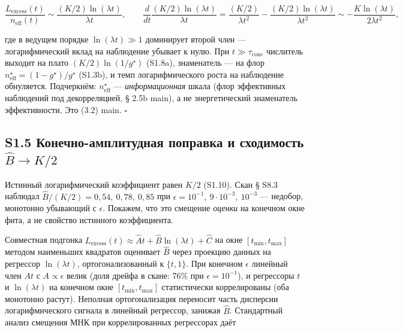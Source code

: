 \documentclass[12pt]{iopart}
\providecommand{\texorpdfstring}[2]{#1}
\begin{document}
\[\frac{L_{\text{excess}}(t)}{n_{\text{eff}}(t)} \sim \frac{(K/2)\ln(\lambda t)}{\lambda t}, \qquad \frac{d}{dt}\frac{(K/2)\ln(\lambda t)}{\lambda t} = \frac{(K/2)}{\lambda t^2} - \frac{(K/2)\ln(\lambda t)}{\lambda t^2} \sim -\frac{K\ln(\lambda t)}{2\lambda t^2},\]



где в ведущем порядке \(\ln(\lambda t) \gg 1\) доминирует второй член --- логарифмический вклад на наблюдение убывает к нулю. При \(t\gg\tau_{\text{conc}}\) числитель выходит на плато \((K/2)\ln(1/g^\star)\) (S1.8a), знаменатель --- на флор \(n_{\text{eff}}^\star = (1-g^\star)/g^\star\) (S1.3b), и темп логарифмического роста на наблюдение обнуляется. Подчеркнём: \(n_{\text{eff}}^\star\) --- \emph{информационная} шкала (флор эффективных наблюдений под декорреляцией, § 2.5b main), а не энергетический знаменатель эффективности. Это (3.2) main. \(\square\)



\subsection{\texorpdfstring{S1.5 Конечно-амплитудная поправка и сходимость \(\hat B \to K/2\)}{S1.5 Конечно-амплитудная поправка и сходимость \textbackslash hat B \textbackslash to K/2}}\label{s1.5-ux43aux43eux43dux435ux447ux43dux43e-ux430ux43cux43fux43bux438ux442ux443ux434ux43dux430ux44f-ux43fux43eux43fux440ux430ux432ux43aux430-ux438-ux441ux445ux43eux434ux438ux43cux43eux441ux442ux44c-hat-b-to-k2}



Истинный логарифмический коэффициент равен \(K/2\) (S1.10). Скан § S8.3 \cite{Andriishin2026b} наблюдал \(\hat B/(K/2) = 0{,}54,\ 0{,}78,\ 0{,}85\) при \(\epsilon = 10^{-1},\ 9\cdot10^{-3},\ 10^{-3}\) --- недобор, монотонно убывающий с \(\epsilon\). Покажем, что это смещение \emph{оценки} на конечном окне фита, а не свойство истинного коэффициента.



Совместная подгонка \(L_{\text{excess}}(t) \approx \hat A t + \hat B\ln(\lambda t) + \hat C\) на окне \([t_{\min}, t_{\max}]\) методом наименьших квадратов оценивает \(\hat B\) через проекцию данных на регрессор \(\ln(\lambda t)\), ортогонализованный к \(\{t, 1\}\). При конечном \(\epsilon\) линейный член \(A t\) с \(A \propto \epsilon\) велик (доля дрейфа в скане: 76\% при \(\epsilon = 10^{-1}\)), и регрессоры \(t\) и \(\ln(\lambda t)\) на конечном окне \([t_{\min}, t_{\max}]\) статистически коррелированы (оба монотонно растут). Неполная ортогонализация переносит часть дисперсии логарифмического сигнала в линейный регрессор, занижая \(\hat B\). Стандартный анализ смещения МНК при коррелированных регрессорах даёт
\end{document}
